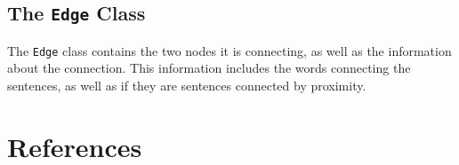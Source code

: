 \documentclass[xcolor={usenames,dvipsnames,svgnames}]{beamer}
\begin{document}
\subsection{The {\tt Edge} Class}
\begin{frame}
The {\tt Edge} class contains the two nodes it is connecting, as well as the information about the connection.
\vskip 1pc
This information includes the words connecting the sentences, as well as if they are sentences connected by proximity.
\end{frame}

\section{References}
\begin{frame}[allowframebreaks]
\nocite{*}
\printbibliography
\end{frame}
\end{document}
